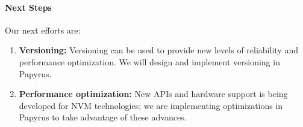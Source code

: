 \paragraph{Next Steps}
Our next efforts are:

\begin{enumerate}
\item \textbf{Versioning: } Versioning can be used to provide new levels of reliability and performance optimization. We will design and implement versioning in Papyrus.

\item \textbf{Performance optimization:} New APIs and hardware support is being developed for NVM technologies; we are implementing optimizations in Papyrus to take advantage of these advances.

\end{enumerate}
